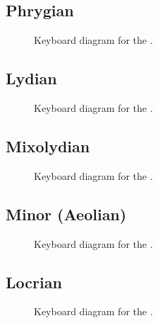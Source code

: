 \documentclass[letterpaper,10pt,english]{sphinxmanual}
\begin{document}
\subsection{Phrygian}
\label{\detokenize{using:phrygian}}
\begin{figure}[htbp]
\centering
\capstart

\noindent{}
\caption{Keyboard diagram for the .}\label{\detokenize{using:id3}}\end{figure}


\subsection{Lydian}
\label{\detokenize{using:lydian}}
\begin{figure}[htbp]
\centering
\capstart

\noindent{}
\caption{Keyboard diagram for the .}\label{\detokenize{using:id4}}\end{figure}


\subsection{Mixolydian}
\label{\detokenize{using:mixolydian}}
\begin{figure}[htbp]
\centering
\capstart

\noindent{}
\caption{Keyboard diagram for the .}\label{\detokenize{using:id5}}\end{figure}


\subsection{Minor (Aeolian)}
\label{\detokenize{using:minor-aeolian}}
\begin{figure}[htbp]
\centering
\capstart

\noindent{}
\caption{Keyboard diagram for the .}\label{\detokenize{using:id6}}\end{figure}


\subsection{Locrian}
\label{\detokenize{using:locrian}}
\begin{figure}[htbp]
\centering
\capstart

\noindent{}
\caption{Keyboard diagram for the .}\label{\detokenize{using:id7}}\end{figure}
\end{document}

